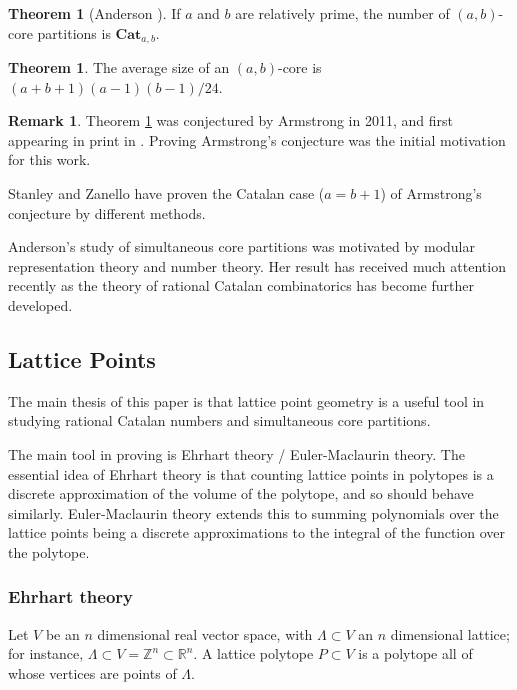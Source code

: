 \documentclass{amsart}[12pt]
\theoremstyle{definition}
\newtheorem{theorem}[dummy]{Theorem}
\newtheorem{remark}[dummy]{Remark}
\newcommand{\Z}{\mathbb{Z}}
\newcommand{\R}{\mathbb{R}}
\newcommand{\Cat}{\mathbf{Cat}}
\begin{document}
\begin{theorem}[Anderson \cite{anderson}]
If $a$ and $b$ are relatively prime, the number of
$(a,b)$-core partitions is $\Cat_{a,b}$.
\end{theorem}


\begin{theorem} \label{thm:armstrong}
The average size of an $(a,b)$-core is $(a+b+1)(a-1)(b-1)/24$.
\end{theorem}

\begin{remark} 
Theorem \ref{thm:armstrong} was conjectured by Armstrong in 2011, and first appearing in print in \cite{AHJ}.  Proving Armstrong's conjecture was the initial motivation for this work.  

Stanley and Zanello \cite{SZ} have proven the Catalan case ($a=b+1$) of Armstrong's conjecture by different methods.   
\end{remark}



Anderson's study of simultaneous core partitions was motivated by modular representation theory and number theory.  Her result has received much attention recently as the theory of rational Catalan combinatorics has become further developed.

\subsection{Lattice Points}

The main thesis of this paper is that lattice point geometry is a useful tool in studying rational Catalan numbers and simultaneous core partitions.  





The main tool in proving is Ehrhart theory / Euler-Maclaurin theory.  The essential idea of Ehrhart theory is that counting lattice points in polytopes is a discrete approximation of the volume of the polytope, and so should behave similarly.  Euler-Maclaurin theory extends this to summing polynomials over the lattice points being a discrete approximations to the integral of the function over the polytope.

\subsubsection{Ehrhart theory}

Let $V$ be an $n$ dimensional real vector space, with $\Lambda\subset V$ an $n$ dimensional lattice; for instance, $\Lambda\subset V=\Z^n\subset \R^n$.  A lattice polytope $P\subset V$ is a polytope all of whose vertices are points of $\Lambda$.  
\end{document}
